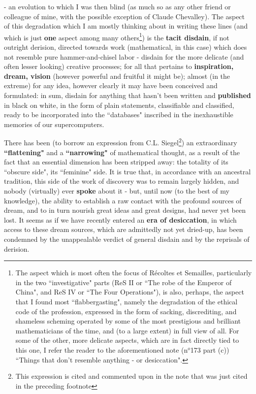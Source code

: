{} - an evolution to which I was then blind (as much so as any other friend or colleague of mine, with the possible exception of Claude Chevalley). The aspect of this degradation which I am mostly thinking about in writing these lines (and which is just \textbf{one} aspect among many others\footnote{The aspect which is most often the focus of R\'ecoltes et Semailles, particularly in the two ``investigative" parts (ReS II or ``The robe of the Emperor of China", and ReS IV or ``The Four Operations"), is also, perhaps, the aspect that I found most ``flabbergasting", namely the degradation of the ethical code of the profession, expressed in the form of sacking, discrediting, and shameless scheming operated by some of the most prestigious and brilliant mathematicians of the time, and (to a large extent) in full view of all. For some of the other, more delicate aspects, which are in fact directly tied to this one, I refer the reader to the aforementioned note (n$^o$173 part (c)) ``Things that don't resemble anything - or desiccation".}) is the \textbf{tacit disdain}, if not outright derision, directed towards work (mathematical, in this case) which does not resemble pure hammer-and-chisel labor - disdain for the more delicate (and often lesser looking) creative processes; for all that pertains to \textbf{inspiration, dream, vision} (however powerful and fruitful it might be); almost (in the extreme) for any idea, however clearly it may have been conceived and formulated: in sum, disdain for anything that hasn't been written and \textbf{published} in black on white, in the form of plain statements, classifiable and classified, ready to be incorporated into the ``databases" inscribed in the inexhaustible memories of our supercomputers. 

There has been (to borrow an expression from C.L. Siegel\footnote{This expression is cited and commented upon in the note that was just cited in the preceding footnote}) an extraordinary \textbf{``flattening"} and a \textbf{``narrowing"} of mathematical thought, as a result of the fact that an essential dimension has been stripped away: the totality of its ``obscure side", its ``feminine" side. It is true that, in accordance with an ancestral tradition, this side of the work of discovery was to remain largely hidden, and nobody (virtually) ever \textbf{spoke} about it - but, until now (to the best of my knowledge), the ability to establish a raw contact with the profound sources of dream, and to in turn nourish great ideas and great designs, had never yet been lost. It seems as if we have recently entered an \textbf{era of desiccation}, in which access to these dream sources, which are admittedly not yet dried-up, has been condemned by the unappealable verdict of general disdain and by the reprisals of derision. 

